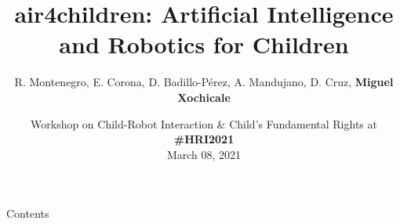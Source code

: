\documentclass[xcolor={dvipsnames},aspectratio=169,10pt]{beamer}
\title{air4children: Artificial Intelligence and Robotics for Children}
\author{
R. Montenegro,
E. Corona,
D. Badillo-P\'erez,
A. Mandujano,
D. Cruz,
{\bf Miguel Xochicale}
}
\date{
Workshop on Child-Robot Interaction \& Child's Fundamental Rights at {\bf \#HRI2021} \\
March 08, 2021
}
\institute{
	\faEnvelope   air4children@gmail.com \\
	\faGithubAlt @air4children \faTwitter @air4children  
		}
\begin{document}
\maketitle

\begin{frame}{Contents}
    \tableofcontents
\end{frame}







\maketitle
\end{document}
